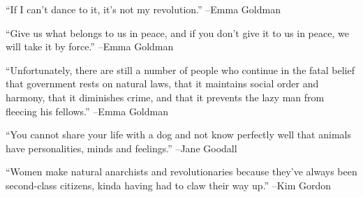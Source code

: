 \documentclass{article}%
\begin{document}
\linebreak%
\vspace{1mm}%
\begin{minipage}{\textwidth}%
\flushleft%
“If I can't dance to it, it's not my revolution.”%
\linebreak%
\vspace{1mm}%
–Emma Goldman%
\linebreak%
\vspace{1mm}%
\end{minipage}%
\linebreak%
\vspace{1mm}%
\begin{minipage}{\textwidth}%
\flushleft%
“Give us what belongs to us in peace, and if you don't give it to us in peace, we will take it by force.”%
\linebreak%
\vspace{1mm}%
–Emma Goldman%
\linebreak%
\vspace{1mm}%
\end{minipage}%
\linebreak%
\vspace{1mm}%
\begin{minipage}{\textwidth}%
\flushleft%
“Unfortunately, there are still a number of people who continue in the fatal belief that government rests on natural laws, that it maintains social order and harmony, that it diminishes crime, and that it prevents the lazy man from fleecing his fellows.”%
\linebreak%
\vspace{1mm}%
–Emma Goldman%
\linebreak%
\vspace{1mm}%
\end{minipage}%
\linebreak%
\vspace{1mm}%
\begin{minipage}{\textwidth}%
\flushleft%
“You cannot share your life with a dog and not know perfectly well that animals have personalities, minds and feelings.”%
\linebreak%
\vspace{1mm}%
–Jane Goodall%
\linebreak%
\vspace{1mm}%
\end{minipage}%
\linebreak%
\vspace{1mm}%
\begin{minipage}{\textwidth}%
\flushleft%
“Women make natural anarchists and revolutionaries because they've always been second{-}class citizens, kinda having had to claw their way up.”%
\linebreak%
\vspace{1mm}%
–Kim Gordon%
\linebreak%
\vspace{1mm}%
\end{minipage}%
\end{document}

